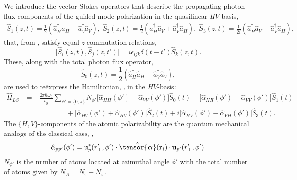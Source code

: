 \documentclass[preprint,aps,pra,onecolumn]{revtex4-1} %
\newcommand{\poltens}{\hat{\tensor{\boldsymbol{\alpha}}}}
\begin{document}
We introduce the vector Stokes operators that describe the propagating photon flux components of the guided-mode polarization in the quasilinear $HV$-basis,
	\begin{align} \label{Eq::StokesComponents}
		\hat{S}_1(z,t) = \frac{1}{2}\left(\hat{a}^\dag_H \hat{a}_H-\hat{a}^\dag_V \hat{a}_V \right), \; \hat{S}_2(z,t) = \frac{1}{2}\left(\hat{a}^\dag_H \hat{a}_V+\hat{a}^\dag_V \hat{a}_H \right), \; \hat{S}_3(z,t) = \frac{1}{2i}\left(\hat{a}^\dag_H \hat{a}_V-\hat{a}^\dag_V \hat{a}_H \right),
	\end{align}
that, from , satisfy equal-$z$ commutation relations,
	\begin{equation} \label{Eq::StokesCommutation}
		\big[\hat{S}_i(z,t), \hat{S}_j(z,t')\big] =i \epsilon_{ijk} \delta(t-t')  \hat{S}_k(z,t).
	\end{equation}
These, along with the total photon flux operator,
	\begin{equation}
		\hat{S}_0(z,t) = \frac{1}{2}\left(\hat{a}^\dag_H \hat{a}_H+\hat{a}^\dag_V \hat{a}_V \right),
	\end{equation}
are used to re\"{e}xpress the Hamiltonian, , in the $HV$-basis: 
	\begin{align}  
		\hat{H}_{LS} & = -\frac{2 \pi \hbar \omega_0}{v_g} \sum_{\phi' = \{ 0, \pi\} }N_{\phi'} \big[\hat{\alpha}_{HH}(\phi')+\hat{\alpha}_{VV}(\phi') \big] \hat{S}_0(t) +  \big[\hat{\alpha}_{HH}(\phi') -\hat{\alpha}_{VV}(\phi') \big] \hat{S}_1(t) \label{Eq::GenHamiltonian} \\
	&\quad \quad \quad \quad \quad \quad+ \big[\hat{\alpha}_{HV}(\phi')+\hat{\alpha}_{HV}(\phi') \big]  \hat{S}_2(t) + i  \big[\hat{\alpha}_{HV}(\phi')-\hat{\alpha}_{VH}(\phi') \big]\hat{S}_3(t).  \nonumber
	\end{align}
The $\{H,V\}$-components of the atomic polarizability are the quantum mechanical analogs of the classical case, , 
	\begin{equation}  \label{Eq::PolarizabilityElementsQuantum} 
		\hat{\alpha}_{p p'}(\phi') = \mathbf{u}^*_p(r'_{\perp},\phi')  \cdot \poltens(\mbf{r}_i) \cdot \mathbf{u}_{p'}(r'_{\perp},\phi').
	\end{equation}
$N_{\phi'}$ is the number of atoms located at azimuthal angle $\phi'$ with the total number of atoms given by $N_A = N_0 + N_\pi$.
\end{document}
